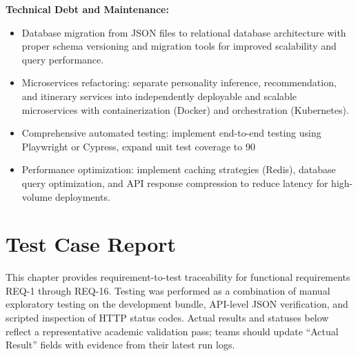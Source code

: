 \documentclass[12pt,oneside,openany]{report}
\begin{document}
\textbf{Technical Debt and Maintenance:}
\begin{itemize}
\item Database migration from JSON files to relational database architecture with proper schema versioning and migration tools for improved scalability and query performance.

\item Microservices refactoring: separate personality inference, recommendation, and itinerary services into independently deployable and scalable microservices with containerization (Docker) and orchestration (Kubernetes).

\item Comprehensive automated testing: implement end-to-end testing using Playwright or Cypress, expand unit test coverage to 90%

\item Performance optimization: implement caching strategies (Redis), database query optimization, and API response compression to reduce latency for high-volume deployments.

\end{itemize}

\chapter{Test Case Report}

This chapter provides requirement-to-test traceability for functional requirements REQ-1 through REQ-16. Testing was performed as a combination of manual exploratory testing on the development bundle, API-level JSON verification, and scripted inspection of HTTP status codes. Actual results and statuses below reflect a representative academic validation pass; teams should update ``Actual Result'' fields with evidence from their latest run logs.
\end{document}
